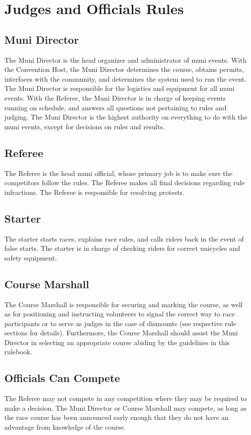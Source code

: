 \chapter{Judges and Officials Rules}

\section{Muni Director}

The Muni Director is the head organizer and administrator of muni events.
With the Convention Host, the Muni Director determines the course, obtains permits, interfaces with the community, and determines the system used to run the event.
The Muni Director is responsible for the logistics and equipment for all muni events.
With the Referee, the Muni Director is in charge of keeping events running on schedule, and answers all questions not pertaining to rules and judging.
The Muni Director is the highest authority on everything to do with the muni events, except for decisions on rules and results.

\section{Referee}

The Referee is the head muni official, whose primary job is to make sure the competitors follow the rules.
The Referee makes all final decisions regarding rule infractions.
The Referee is responsible for resolving protests.

\section{Starter}

The starter starts races, explains race rules, and calls riders back in the event of false starts.
The starter is in charge of checking riders for correct unicycles and safety equipment.

\section{Course Marshall}
The Course Marshall is responsible for securing and marking the course, as well as for positioning and instructing volunteers to signal the correct way to race participants or to serve as judges in the case of dismounts (see respective rule sections for details).  Furthermore, the Course Marshall should assist the Muni Director in selecting an appropriate course abiding by the guidelines in this rulebook.

\section{Officials Can Compete}

The Referee may not compete in any competition where they may be required to make a decision.
The Muni Director or Course Marshall may compete, as long as the race course has been announced early enough that they do not have an advantage from knowledge of the course.
